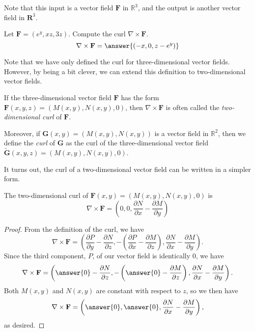 \documentclass{ximera}
\begin{document}
Note that this input is a vector field $\mathbf{F}$ in $\mathbb{R}^3$, and the output is another vector field in $\mathbf{R}^3$.

\begin{problem}
Let $\mathbf{F}=(e^y, xz, 3z)$. Compute the curl $\nabla\times\mathbf{F}$.
\[
\nabla\times\mathbf{F} = \answer{(-x,0,z-e^y)}
\]
\end{problem}

Note that we have only defined the curl for three-dimensional vector fields. However, by being a bit clever, we can extend this definition to two-dimensional vector fields.

\begin{definition}
If the three-dimensional vector field $\mathbf{F}$ has the form $\mathbf{F}(x,y,z)=(M(x,y), N(x,y), 0)$, then $\nabla\times\mathbf{F}$ is often called the \emph{two-dimensional curl} of $\mathbf{F}$.

Moreover, if $\mathbf{G}(x,y)=(M(x,y), N(x,y))$ is a vector field in $\mathbb{R}^2$, then we define the \emph{curl} of $\mathbf{G}$ as the curl of the three-dimensional vector field $\widetilde{\mathbf{G}}(x,y,z)=(M(x,y),N(x,y),0)$.
\end{definition}

It turns out, the curl of a two-dimensional vector field can be written in a simpler form.

\begin{proposition}
The two-dimensional curl of $\mathbf{F}(x,y) = (M(x,y),N(x,y),0)$ is
\[
\nabla\times \mathbf{F} = \left(0,0,\dfrac{\partial N}{\partial x} - \dfrac{\partial M}{\partial y}\right)
\]
\end{proposition}

\begin{proof}
From the definition of the curl, we have
\[
\nabla\times\mathbf{F} = \left(\dfrac{\partial P}{\partial y}-\dfrac{\partial N}{\partial z}, -\left(\dfrac{\partial P}{\partial x}-\dfrac{\partial M}{\partial z}\right), \dfrac{\partial N}{\partial x} - \dfrac{\partial M}{\partial y}\right).
\]
Since the third component, $P$, of our vector field is identically $0$, we have
\[
\nabla\times\mathbf{F} = \left(\answer{0}-\dfrac{\partial N}{\partial z}, -\left(\answer{0}-\dfrac{\partial M}{\partial z}\right), \dfrac{\partial N}{\partial x} - \dfrac{\partial M}{\partial y}\right).
\]
Both $M(x,y)$ and $N(x,y)$ are constant with respect to $z$, so we then have
\[
\nabla\times\mathbf{F} = \left(\answer{0}, \answer{0}, \dfrac{\partial N}{\partial x} - \dfrac{\partial M}{\partial y}\right),
\]
as desired.
\end{proof}
\end{document}
